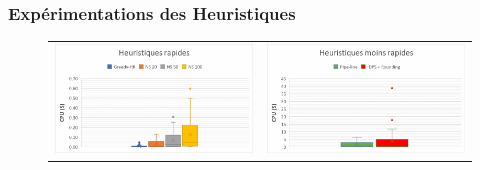 \documentclass[hyperref={bookmarks=false},aspectratio=169]{beamer}
\begin{document}
\begin{frame}
\addtocounter{framenumber}{-1}
\frametitle{Expérimentations des Heuristiques }%
\begin{figure}[H]
	\centering
	\begin{tabular}{c c}
		\includegraphics[width=6.5cm]{figures/slide_CPU_NS_Heuristiques_INST_VAR.pdf}&%
		\includegraphics[width=6.5cm]{figures/slide_CPU_ST_Pi_Heuristiques_INST_VAR.pdf}%
	\end{tabular}
\end{figure}
\end{frame}
\end{document}
